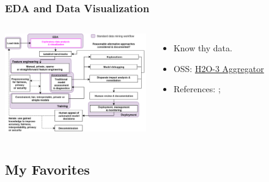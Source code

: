 \documentclass[11pt,
               aspectratio=169,
               hyperref={colorlinks}
               ]{beamer}
\begin{document}
		\begin{frame}
		
			\frametitle{EDA and Data Visualization}		
			
			\begin{columns}
	
				\centering
				\includegraphics[height=120pt]{img/eda.png}
				
				\vspace{-5pt}
				\begin{itemize}
					\item Know thy data.
					\item OSS: \href{http://docs.h2o.ai/h2o/latest-stable/h2o-docs/data-science/aggregator.html}{H2O-3 Aggregator}
					\item References: ; 
				\end{itemize}
				
			\end{columns}
		
		\end{frame}
		
		\subsection{My Favorites}
		
\end{document}
